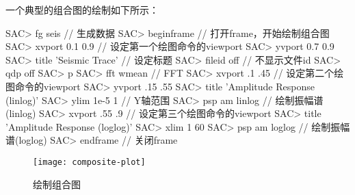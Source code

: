 一个典型的组合图的绘制如下所示：
\begin{SACCode}
SAC> fg seis                        // 生成数据
SAC> beginframe                     // 打开frame，开始绘制组合图
SAC> xvport 0.1 0.9                 // 设定第一个绘图命令的viewport
SAC> yvport 0.7 0.9
SAC> title 'Seismic Trace'          // 设定标题
SAC> fileid off                     // 不显示文件id
SAC> qdp off
SAC> p
SAC> fft wmean                      // FFT
SAC> xvport .1 .45                  // 设定第二个绘图命令的viewport
SAC> yvport .15 .55
SAC> title 'Amplitude Response (linlog)'
SAC> ylim 1e-5 1                    // Y轴范围
SAC> psp am linlog                  // 绘制振幅谱(linlog)
SAC> xvport .55 .9                  // 设定第三个绘图命令的viewport
SAC> title 'Amplitude Response (loglog)'
SAC> xlim 1 60
SAC> psp am loglog                  // 绘制振幅谱(loglog)
SAC> endframe                       // 关闭frame
\end{SACCode}

\begin{figure}[H]
\centering
\texttt{[image: composite-plot]}
\caption{绘制组合图}
\label{fig:composite-plot}
\end{figure}

